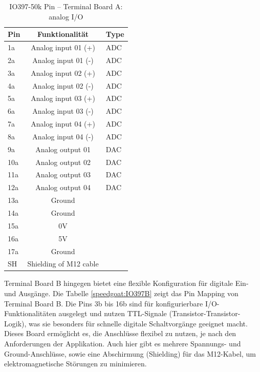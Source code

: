 \begin{table}[ht]
	\centering
	\caption{IO397-50k Pin   – Terminal Board A: analog I/O \cite{speedgoat:IO397}}
	\label{speedgoat:IO397A}
	\begin{tabular}{lcl}
		\hline
		\textbf{Pin}             & \textbf{Funktionalität} & \textbf{Type} \\ \hline
		\multicolumn{1}{l|}{1a}  & Analog input 01 (+)     & ADC           \\
		\multicolumn{1}{l|}{2a}  & Analog input 01 (-)     & ADC           \\
		\multicolumn{1}{l|}{3a}  & Analog input 02 (+)     & ADC           \\
		\multicolumn{1}{l|}{4a}  & Analog input 02 (-)     & ADC           \\
		\multicolumn{1}{l|}{5a}  & Analog input 03 (+)     & ADC           \\
		\multicolumn{1}{l|}{6a}  & Analog input 03 (-)     & ADC           \\
		\multicolumn{1}{l|}{7a}  & Analog input 04 (+)     & ADC           \\
		\multicolumn{1}{l|}{8a}  & Analog input 04 (-)     & ADC           \\ \hline
		\multicolumn{1}{l|}{9a}  & Analog output 01        & DAC           \\
		\multicolumn{1}{l|}{10a} & Analog output 02        & DAC           \\
		\multicolumn{1}{l|}{11a} & Analog output 03        & DAC           \\
		\multicolumn{1}{l|}{12a} & Analog output 04        & DAC           \\ \hline
		\multicolumn{1}{l|}{13a} & Ground                  &               \\
		\multicolumn{1}{l|}{14a} & Ground                  &               \\
		\multicolumn{1}{l|}{15a} & 0V                      &               \\
		\multicolumn{1}{l|}{16a} & 5V                      &               \\
		\multicolumn{1}{l|}{17a} & Ground                  &               \\
		\multicolumn{1}{l|}{SH}  & Shielding of M12 cable  &               \\ \hline
	\end{tabular}
\end{table}

Terminal Board B hingegen bietet eine flexible Konfiguration für digitale Ein- und Ausgänge. Die Tabelle \ref{speedgoat:IO397B} zeigt das Pin Mapping von Terminal Board B. Die Pins 3b bis 16b sind für konfigurierbare I/O-Funktionalitäten ausgelegt und nutzen TTL-Signale (Transistor-Transistor-Logik), was sie besonders für schnelle digitale Schaltvorgänge geeignet macht. Dieses Board ermöglicht es, die Anschlüsse flexibel zu nutzen, je nach den Anforderungen der Applikation. Auch hier gibt es mehrere Spannungs- und Ground-Anschlüsse, sowie eine Abschirmung (Shielding) für das M12-Kabel, um elektromagnetische Störungen zu minimieren.

